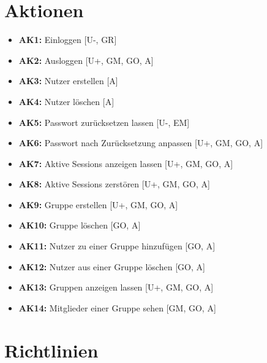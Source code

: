 \documentclass[fontsize=12pt,DIV=14,BCOR=10mm,a4paper,parskip=half-,ngerman,english,bibliography=totocnumbered]{scrreprt}
\begin{document}
\chapter{Aktionen}

\begin{itemize}
  \item \textbf{AK1:} Einloggen [U-, GR]
  \item \textbf{AK2:} Ausloggen [U+, GM, GO, A]
  \item \textbf{AK3:} Nutzer erstellen [A]
  \item \textbf{AK4:} Nutzer löschen [A]
  \item \textbf{AK5:} Passwort zurücksetzen lassen [U-, EM]
  \item \textbf{AK6:} Passwort nach Zurücksetzung anpassen [U+, GM, GO, A]
  \item \textbf{AK7:} Aktive Sessions anzeigen lassen [U+, GM, GO, A]
  \item \textbf{AK8:} Aktive Sessions zerstören [U+, GM, GO, A]
  \item \textbf{AK9:} Gruppe erstellen [U+, GM, GO, A]
  \item \textbf{AK10:} Gruppe löschen [GO, A]
  \item \textbf{AK11:} Nutzer zu einer Gruppe hinzufügen [GO, A]
  \item \textbf{AK12:} Nutzer aus einer Gruppe löschen [GO, A]
  \item \textbf{AK13:} Gruppen anzeigen lassen [U+, GM, GO, A]
  \item \textbf{AK14:} Mitglieder einer Gruppe sehen [GM, GO, A]
\end{itemize}

\chapter{Richtlinien}

\end{document}
